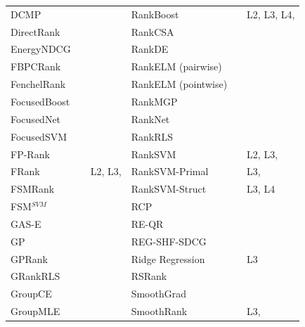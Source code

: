 \documentclass{sig-alternate}
\begin{document}
\begin{table}[!hpt]
{\begin{tabular}{lll|lll}
DCMP & \cite{Renjifo2012}  & \cite{Renjifo2012}  & RankBoost & \cite{Freund2003} & L2, L3, L4, \cite{Busa-Fekete2013, Alcantara2010} \\ 
DirectRank & \cite{Tan2013} & \cite{Tan2013} & RankCSA & \cite{He2010} & \cite{He2010} \\ 
EnergyNDCG & \cite{Freno2011} & \cite{Freno2011} & RankDE & \cite{Bollegala2011} & \cite{Sato2013} \\ 
FBPCRank & \cite{Lai2011} & \cite{Lai2011} & RankELM (pairwise) & \cite{Zong2013} & \cite{Zong2013} \\ 
FenchelRank & \cite{Lai2013} & \cite{Lai2013, Lai2013b, Laporte2013} & RankELM (pointwise) & \cite{Zong2013} & \cite{Zong2013} \\ 
FocusedBoost & \cite{Niu2012} & \cite{Niu2012} & RankMGP & \cite{Lin2012} & \cite{Lin2012} \\ 
FocusedNet & \cite{Niu2012} & \cite{Niu2012} & RankNet & \cite{Burges2005} & \cite{Busa-Fekete2013, Papini2012, Niu2012} \\ 
FocusedSVM & \cite{Niu2012} & \cite{Niu2012} & RankRLS & \cite{Pahikkala2009} & \cite{Pahikkala2010} \\ 
FP-Rank & \cite{Song2013} & \cite{Song2013} & RankSVM & \cite{Herbrich1999, Joachims2002} & L2, L3, \cite{Busa-Fekete2013, Freno2011, He2010, Alcantara2010} \\ 
FRank & \cite{Tsai2007} & L2, L3, \cite{Wang2012} & RankSVM-Primal &  & L3, \cite{Lai2011} \\ 
FSMRank & \cite{Lai2013c} & \cite{Lai2013c,Laporte2013} & RankSVM-Struct &  & L3, L4 \\
FSM$^{SVM}$ & \cite{Lai2013c} & \cite{Lai2013c} & RCP & \cite{Elsas2008} & \cite{Elsas2008} \\ 
GAS-E & \cite{Geng2007} & \cite{Lai2013c} & RE-QR & \cite{Veloso2010} & \cite{Veloso2010} \\
GP & \cite{DeAlmeida2007} & \cite{Alcantara2010} & REG-SHF-SDCG & \cite{Wu2009} & \cite{Wu2009} \\  
GPRank & \cite{Silva2009} & \cite{Torkestani2012} & Ridge Regression & \cite{Cossock2006} & L3 \\
GRankRLS & \cite{Pahikkala2010} & \cite{Pahikkala2010} & RSRank & \cite{Sun2009} & \cite{Lai2013} \\ 
GroupCE & \cite{Lin2011} & \cite{Lin2011} & SmoothGrad & \cite{Le2007} & \cite{Tan2013} \\ 
GroupMLE & \cite{Lin2010} & \cite{Lin2011} & SmoothRank & \cite{Chapelle2010} & L3, \cite{Chapelle2010} \\

\end{tabular}}
\end{table}
\end{document}
